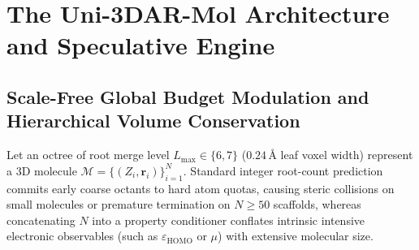 \documentclass[11pt,a4paper]{article}
\begin{document}
\section{The Uni-3DAR-Mol Architecture and Speculative Engine}
\label{sec:method}

\subsection{Scale-Free Global Budget Modulation and Hierarchical Volume Conservation}
\label{sec:budget}

Let an octree of root merge level $L_{\max} \in \{6, 7\}$ ($0.24\,\text{\AA}$ leaf voxel width) represent a 3D molecule $\mathcal{M} = \{(Z_i, \mathbf{r}_i)\}_{i=1}^N$. Standard integer root-count prediction commits early coarse octants to hard atom quotas, causing steric collisions on small molecules or premature termination on $N \ge 50$ scaffolds, whereas concatenating $N$ into a property conditioner conflates intrinsic intensive electronic observables (such as $\varepsilon_{\text{HOMO}}$ or $\mu$) with extensive molecular size.
\end{document}
